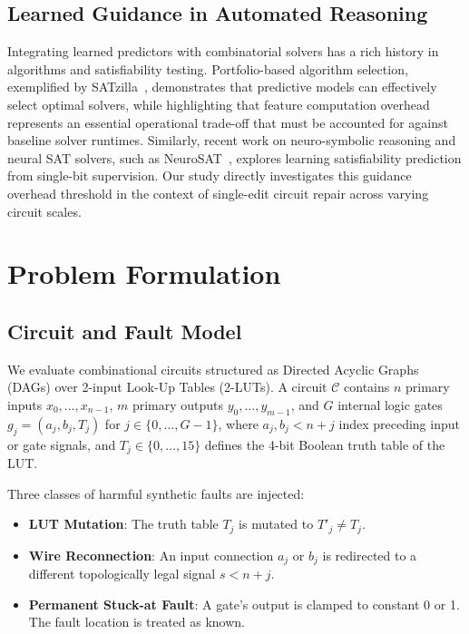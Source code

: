 \documentclass[11pt]{article}
\begin{document}
\subsection{Learned Guidance in Automated Reasoning}
Integrating learned predictors with combinatorial solvers has a rich history in algorithms and satisfiability testing. Portfolio-based algorithm selection, exemplified by SATzilla~\citep{xu2008satzilla}, demonstrates that predictive models can effectively select optimal solvers, while highlighting that feature computation overhead represents an essential operational trade-off that must be accounted for against baseline solver runtimes. Similarly, recent work on neuro-symbolic reasoning and neural SAT solvers, such as NeuroSAT~\citep{selsam2019learning}, explores learning satisfiability prediction from single-bit supervision. Our study directly investigates this guidance overhead threshold in the context of single-edit circuit repair across varying circuit scales.

\section{Problem Formulation}

\subsection{Circuit and Fault Model}
We evaluate combinational circuits structured as Directed Acyclic Graphs (DAGs) over 2-input Look-Up Tables (2-LUTs). A circuit $\mathcal{C}$ contains $n$ primary inputs $x_0, \dots, x_{n-1}$, $m$ primary outputs $y_0, \dots, y_{m-1}$, and $G$ internal logic gates $g_j = (a_j, b_j, T_j)$ for $j \in \{0, \dots, G-1\}$, where $a_j, b_j < n + j$ index preceding input or gate signals, and $T_j \in \{0, \dots, 15\}$ defines the 4-bit Boolean truth table of the LUT.

Three classes of harmful synthetic faults are injected:
\begin{itemize}
    \item \textbf{LUT Mutation}: The truth table $T_j$ is mutated to $T'_j \ne T_j$.
    \item \textbf{Wire Reconnection}: An input connection $a_j$ or $b_j$ is redirected to a different topologically legal signal $s < n + j$.
    \item \textbf{Permanent Stuck-at Fault}: A gate's output is clamped to constant 0 or 1. The fault location is treated as known.
\end{itemize}
\end{document}
